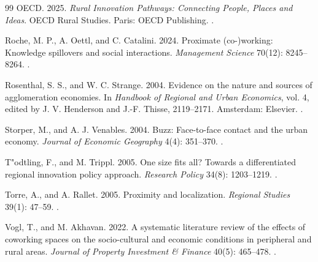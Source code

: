 \begin{thebibliography}{99}
OECD. 2025. \emph{Rural Innovation Pathways: Connecting People, Places and Ideas}. OECD Rural Studies. Paris: OECD Publishing. .

Roche, M. P., A. Oettl, and C. Catalini. 2024. Proximate (co-)working: Knowledge spillovers and social interactions. \emph{Management Science} 70(12): 8245--8264. .

Rosenthal, S. S., and W. C. Strange. 2004. Evidence on the nature and sources of agglomeration economies. In \emph{Handbook of Regional and Urban Economics}, vol. 4, edited by J. V. Henderson and J.-F. Thisse, 2119--2171. Amsterdam: Elsevier. .

Storper, M., and A. J. Venables. 2004. Buzz: Face-to-face contact and the urban economy. \emph{Journal of Economic Geography} 4(4): 351--370. .

T{"o}dtling, F., and M. Trippl. 2005. One size fits all? Towards a differentiated regional innovation policy approach. \emph{Research Policy} 34(8): 1203--1219. .

Torre, A., and A. Rallet. 2005. Proximity and localization. \emph{Regional Studies} 39(1): 47--59. .

Vogl, T., and M. Akhavan. 2022. A systematic literature review of the effects of coworking spaces on the socio-cultural and economic conditions in peripheral and rural areas. \emph{Journal of Property Investment \& Finance} 40(5): 465--478. .

\end{thebibliography}
